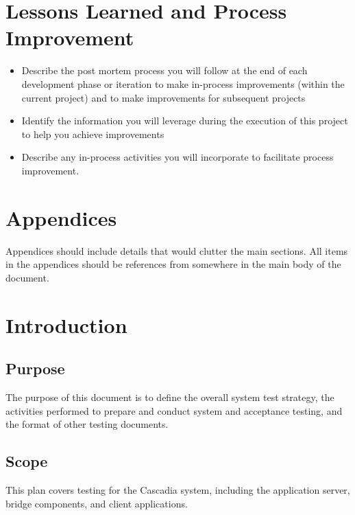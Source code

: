 \documentclass[11pt]{report}
\begin{document}
\chapter{Lessons Learned and Process Improvement}
\begin{itemize}
\item Describe the post mortem process you will follow at the end of each development phase or
  iteration to make in-process improvements (within the current project) and to make improvements
  for subsequent projects
\item Identify the information you will leverage during the execution of this project to help you
  achieve improvements
\item Describe any in-process activities you will incorporate to facilitate process improvement.
\end{itemize}



\chapter{Appendices}
Appendices should include details that would clutter the main sections.  All items in the appendices
should be references from somewhere in the main body of the document.


\chapter{Introduction}

\section{Purpose}


The purpose of this document is to define the overall system test strategy, the activities performed
to prepare and conduct system and acceptance testing, and the format of other testing documents.

\section{Scope}
This plan covers testing for the Cascadia system, including the application server, bridge
components, and client applications.
\end{document}
